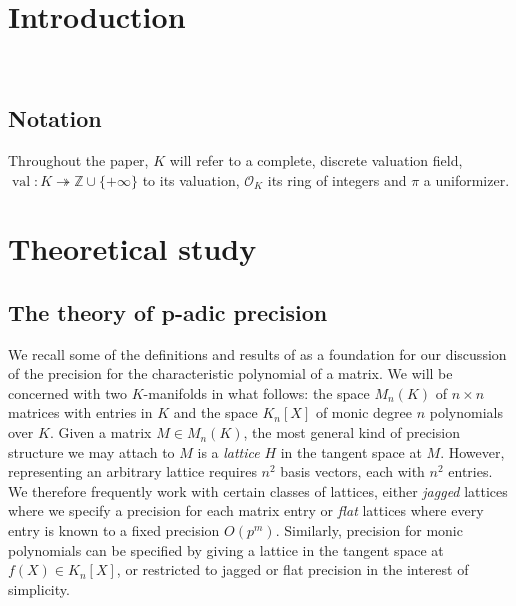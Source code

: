 \documentclass{sig-alternate-05-2015}
\DeclareMathOperator{\val}{val}
\newcommand{\Z}{\mathbb Z}
\newcommand{\OK}{\mathcal{O}_K}
\def\todo#1{\ \!\!{\color{red} #1}}
\begin{document}
%
%

\section{Introduction}

\todo{Example of $M$ and $M + 1$}

\subsection{Notation} Throughout the paper, $K$ will refer to a complete,
discrete valuation field, $\val : K \twoheadrightarrow \Z \cup \{+\infty\}$ to its valuation,
$\OK$ its ring of integers and $\pi$ a uniformizer.

\section{Theoretical study}

\subsection{The theory of p-adic precision}

We recall some of the definitions and results of \cite{caruso-roe-vaccon:14a}
as a foundation for our discussion of the precision for the characteristic polynomial
of a matrix.  We will be concerned with two $K$-manifolds in what follows:
the space $M_n(K)$ of $n \times n$ matrices with entries in $K$ and the space
$K_n[X]$ of monic degree $n$ polynomials over $K$.  Given a matrix $M \in M_n(K)$,
the most general kind of precision structure we may attach to $M$ is a
\emph{lattice} $H$ in the tangent space at $M$.  However, representing an
arbitrary lattice requires $n^2$ basis vectors, each with $n^2$ entries.  We therefore
frequently work with certain classes of lattices, either \emph{jagged} lattices
where we specify a precision for each matrix entry or \emph{flat} lattices where
every entry is known to a fixed precision $O(p^m)$.  Similarly, precision for
monic polynomials can be specified by giving a lattice in the tangent space
at $f(X) \in K_n[X]$, or restricted to jagged or flat precision in the interest
of simplicity.
\end{document}
